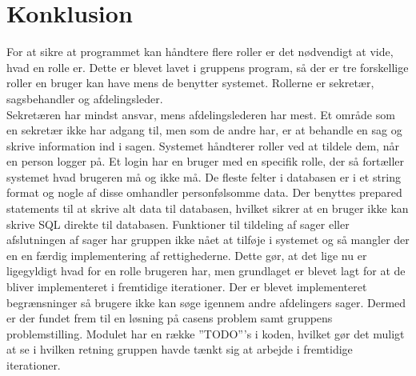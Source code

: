 \chapter{Konklusion}
For at sikre at programmet kan håndtere flere roller er det nødvendigt at vide, hvad en rolle er. 
Dette er blevet lavet i gruppens program, så der er tre forskellige roller en bruger kan have mens de benytter systemet. 
Rollerne er sekretær, sagsbehandler og afdelingsleder. \\
Sekretæren har mindst ansvar, mens afdelingslederen har mest. 
Et område som en sekretær ikke har adgang til, men som de andre har, er at behandle en sag og skrive information ind i sagen. 
Systemet håndterer roller ved at tildele dem, når en person logger på. 
Et login har en bruger med en specifik rolle, der så fortæller systemet hvad brugeren må og ikke må. 
De fleste felter i databasen er i et string format og nogle af disse omhandler personfølsomme data. 
Der benyttes prepared statements til at skrive alt data til databasen, hvilket sikrer at en bruger ikke kan skrive SQL direkte til databasen. 
Funktioner til tildeling af sager eller afslutningen af sager har gruppen ikke nået at tilføje i systemet og så mangler der en en færdig implementering af rettighederne. 
Dette gør, at det lige nu er ligegyldigt hvad for en rolle brugeren har, men grundlaget er blevet lagt for at de bliver implementeret i fremtidige iterationer. 
Der er blevet implementeret begrænsninger så brugere ikke kan søge igennem andre afdelingers sager. 
Dermed er der fundet frem til en løsning på casens problem samt gruppens problemstilling. 
Modulet har en række ”TODO”’s i koden, hvilket gør det muligt at se i hvilken retning gruppen havde tænkt sig at arbejde i fremtidige iterationer.\\

